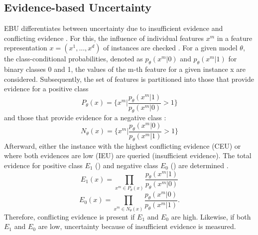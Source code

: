 \subsection{Evidence-based Uncertainty} 
\label{subsec:evidence_based_uncertainty}
%
\Ac{EBU} differentiates between uncertainty due to insufficient evidence and conflicting evidence \cite{nguyen2021howtomeasure}.
For this, the influence of individual features $x^m$ in a feature representation 
$x = (x^1,..., x^d)$ of instances are checked \cite{nguyen2021howtomeasure}.
For a given model $\theta$, the class-conditional probabilities, denoted as $p_{\theta}(x^m |0)$ and $p_{\theta}(x^m | 1)$ for binary classes 0 and 1, the values of the m-th feature for a given instance x are considered.
Subsequently, the set of features is partitioned into those that provide evidence for a positive class \cite{nguyen2021howtomeasure}
\begin{equation}
    P_{\theta}(x) = \bigg\{ x^m \bigg| \frac{p_{\theta}(x^m|1)}{p_{\theta}(x^m|0)} > 1 \bigg\} 
\end{equation}
and those that provide evidence for a negative class \cite{nguyen2021howtomeasure}:
 \begin{equation}
    N_{\theta}(x) = \bigg\{ x^m \bigg| \frac{p_{\theta}(x^m|0)}{p_{\theta}(x^m|1)} > 1 \bigg\} 
\end{equation}
Afterward, either the instance with the highest conflicting evidence (\ac{CEU}) or where both evidences are low (\ac{IEU}) are queried (insufficient evidence).
The total evidence for positive class $E_1$ () and negative class $E_0$ () are determined \cite{nguyen2021howtomeasure}.
\begin{equation} \label{eq:e_1}
    E_1(x) = \prod\limits_{x^m \in P_{\theta}(x)} \frac{p_{\theta}(x^m|1)}{p_{\theta}(x^m|0)}
\end{equation}
\begin{equation} \label{eq:e_0}
    E_0(x) = \prod\limits_{x^m \in N_{\theta}(x)} \frac{p_{\theta}(x^m|0)}{p_{\theta}(x^m|1)}.
\end{equation} 
Therefore, conflicting evidence is present if $E_1$ and $E_0$ are high.
Likewise, if both $E_1$ and $E_0$ are low, uncertainty because of insufficient evidence is measured.